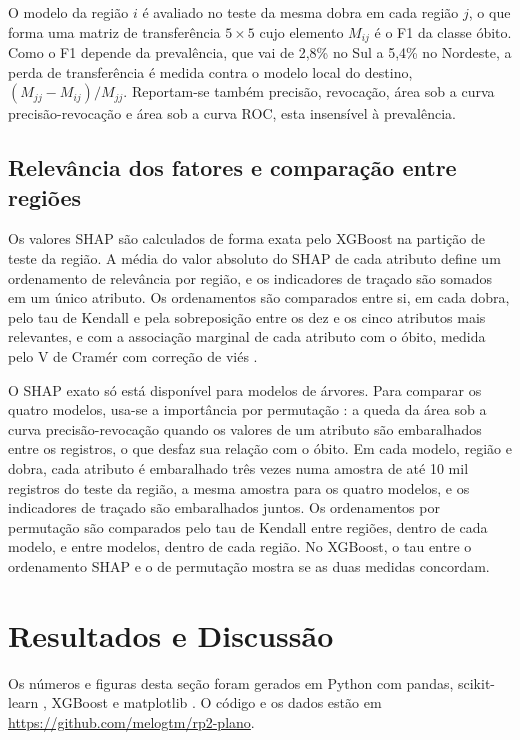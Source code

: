 \documentclass[12pt]{article}
\begin{document}
O modelo da região $i$ é avaliado no teste da mesma dobra em cada
região $j$, o que forma uma matriz de transferência
$5\times5$ cujo elemento $M_{ij}$ é o F1 da classe óbito. Como o F1 depende da prevalência,
que vai de 2,8\% no Sul a 5,4\% no Nordeste, a perda de transferência é
medida contra o modelo local do destino, $(M_{jj}-M_{ij})/M_{jj}$.
Reportam-se também precisão, revocação, área sob a curva
precisão-revocação \cite{saito2015} e área sob a curva ROC, esta
insensível à prevalência.

\subsection{Relevância dos fatores e comparação entre regiões}

Os valores SHAP \cite{lundberg2017} são calculados de forma exata pelo
XGBoost na partição de teste da região. A média do valor absoluto do
SHAP de cada atributo define um ordenamento de relevância por região, e os indicadores de traçado são
somados em um único atributo. Os ordenamentos são comparados entre si,
em cada dobra, pelo tau de Kendall \cite{kendall1938} e pela
sobreposição entre os dez e os cinco atributos mais relevantes, e com a
associação marginal de cada atributo com o óbito, medida pelo V de
Cramér com correção de viés \cite{bergsma2013}.

O SHAP exato só está disponível para modelos de árvores. Para comparar os
quatro modelos, usa-se a importância por permutação \cite{breiman2001}:
a queda da área sob a curva precisão-revocação quando os valores de um
atributo são embaralhados entre os registros, o que desfaz sua relação
com o óbito. Em cada modelo, região e dobra, cada atributo é embaralhado
três vezes numa amostra de até 10 mil registros do teste da região, a
mesma amostra para os quatro modelos, e os indicadores de traçado são
embaralhados juntos. Os ordenamentos por permutação são comparados pelo
tau de Kendall entre regiões, dentro de cada modelo, e entre modelos,
dentro de cada região. No XGBoost, o tau entre o ordenamento SHAP e o
de permutação mostra se as duas medidas concordam.


\section{Resultados e Discussão}

Os números e figuras desta seção foram gerados em Python com pandas,
scikit-learn \cite{pedregosa2011}, XGBoost e matplotlib \cite{hunter2007}. O código e os
dados estão em \url{https://github.com/melogtm/rp2-plano}.
\end{document}
